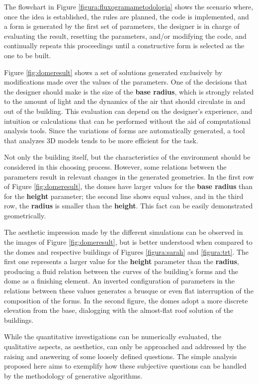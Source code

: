 \documentclass[preprint,12pt,3p]{elsarticle}
\begin{document}
The flowchart in Figure \ref{figura:fluxogramametodologia} shows the scenario where, once the idea is established, the rules are planned, the code is implemented, and a form is generated by the first set of parameters, the designer is in charge of evaluating the result, resetting the parameters, and/or modifying the code, and continually repeats this proceedings until a constructive form is selected as the one to be built.

Figure \ref{fig:domeresult} shows a set of solutions generated exclusively by modifications made over the values of the parameters. One of the decisions that the designer should make is the size of the \textbf{base radius}, which is strongly related to the amount of light and the dynamics of the air that should circulate in and out of the building. This evaluation can depend on the designer's experience, and intuition or calculations that can be performed without the aid of computational analysis tools. Since the variations of forms are automatically generated, a tool that analyzes 3D models tends to be more efficient for the task.

Not only the building itself, but the characteristics of the environment should be considered in this choosing process. However, some relations between the parameters result in relevant changes in the generated geometries. In the first row of Figure \ref{fig:domeresult}, the domes have larger values for the \textbf{base radius} than for the \textbf{height} parameter; the second line shows equal values, and in the third row, the \textbf{radius} is smaller than the \textbf{height}. This fact can be easily demonstrated geometrically. 

The aesthetic impression made by the different simulations can be observed in the images of Figure \ref{fig:domeresult}, but is better understood when compared to the domes and respective buildings of Figures \ref{figura:sarah} and \ref{figura:trt}. The first one represents a larger value for the \textbf{height} parameter than the \textbf{radius}, producing a fluid relation between the curves of the building's forms and the dome as a finishing element. An inverted configuration of parameters in the relations between these values generates a brusque or even flat interruption of the composition of the forms. In the second figure, the domes adopt a more discrete elevation from the base, dialogging with the almost-flat roof solution of the buildings.

While the quantitative investigations can be numerically evaluated, the qualitative aspects, as aesthetics, can only be approached and addressed by the raising and answering of some loosely defined questions. The simple analysis proposed here aims to exemplify how these subjective questions can be handled by the methodology of generative algorithms.
\end{document}
